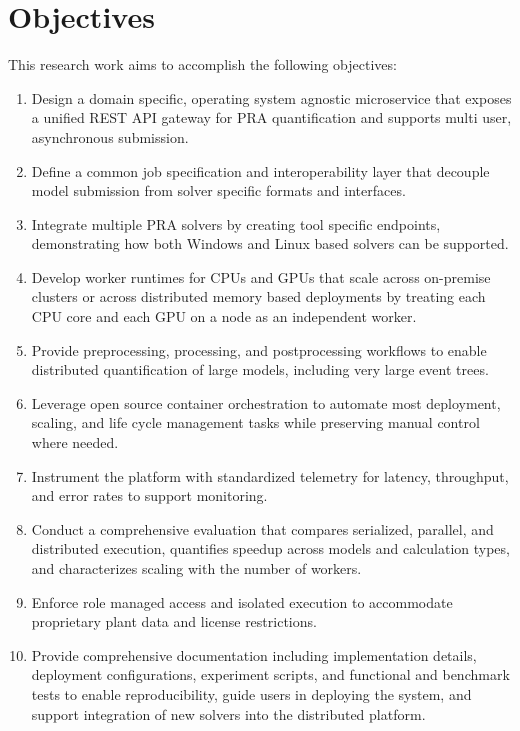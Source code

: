 \section{Objectives}
This research work aims to accomplish the following objectives:
\begin{enumerate}
    \item Design a domain specific, operating system agnostic microservice that exposes a unified REST API gateway for PRA quantification and supports multi user, asynchronous submission.
    \item Define a common job specification and interoperability layer that decouple model submission from solver specific formats and interfaces.
    \item Integrate multiple PRA solvers by creating tool specific endpoints, demonstrating how both Windows and Linux based solvers can be supported.
    \item Develop worker runtimes for CPUs and GPUs that scale across on-premise clusters or across distributed memory based deployments by treating each CPU core and each GPU on a node as an independent worker.
    \item Provide preprocessing, processing, and postprocessing workflows to enable distributed quantification of large models, including very large event trees.
    \item Leverage open source container orchestration to automate most deployment, scaling, and life cycle management tasks while preserving manual control where needed.
    \item Instrument the platform with standardized telemetry for latency, throughput, and error rates to support monitoring.
    \item Conduct a comprehensive evaluation that compares serialized, parallel, and distributed execution, quantifies speedup across models and calculation types, and characterizes scaling with the number of workers.
    \item Enforce role managed access and isolated execution to accommodate proprietary plant data and license restrictions.
    \item Provide comprehensive documentation including implementation details, deployment configurations, experiment scripts, and functional and benchmark tests to enable reproducibility, guide users in deploying the system, and support integration of new solvers into the distributed platform.
\end{enumerate}


